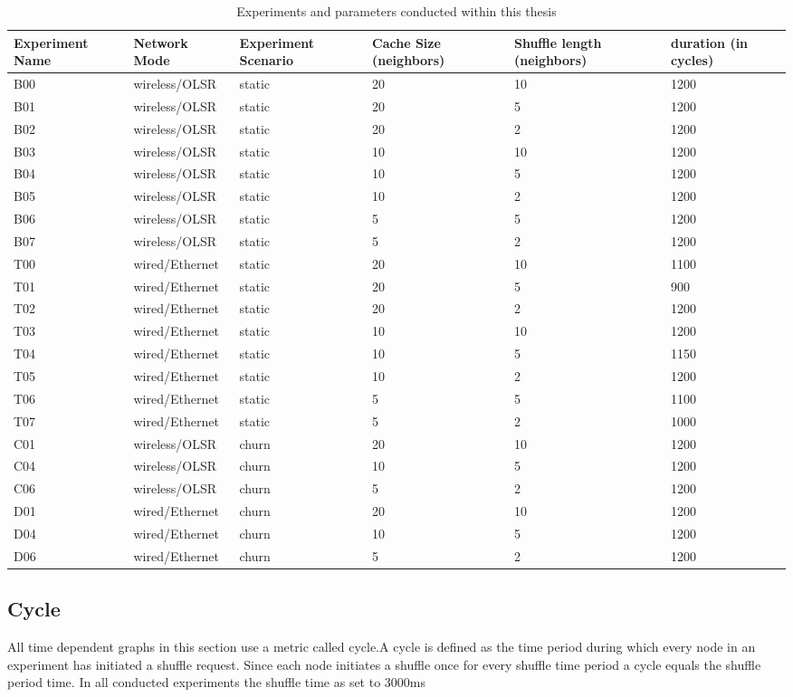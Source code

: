  \begin{table}
\begin{tabular} { |p{2cm}|l|p{1.9cm}|p{2cm}|p{2.5cm}|p{1.9cm}|}
\hline
Experiment Name & Network Mode & Experiment Scenario & Cache Size (neighbors) &
Shuffle length (neighbors) & duration (in cycles)\\
\hline
\hline
B00 & wireless/OLSR & static & 20 & 10 & 1200\\
B01 & wireless/OLSR & static & 20 & 5 & 1200\\
B02 & wireless/OLSR & static & 20 & 2 & 1200\\
B03 & wireless/OLSR & static & 10 & 10 & 1200\\
B04 & wireless/OLSR & static & 10 & 5 & 1200\\
B05 & wireless/OLSR & static & 10 & 2 & 1200\\
B06 & wireless/OLSR & static & 5 & 5 & 1200\\
B07 & wireless/OLSR & static & 5 & 2 & 1200\\
T00 & wired/Ethernet & static & 20 & 10 & 1100\\
T01 & wired/Ethernet & static & 20 & 5 & 900\\
T02 & wired/Ethernet & static & 20 & 2 & 1200\\
T03 & wired/Ethernet & static & 10 & 10 & 1200\\
T04 & wired/Ethernet & static & 10 & 5 & 1150\\
T05 & wired/Ethernet & static & 10 & 2 & 1200\\
T06 & wired/Ethernet & static & 5 & 5 & 1100\\
T07 & wired/Ethernet & static & 5 & 2 & 1000\\
C01 & wireless/OLSR & churn & 20 & 10 & 1200\\
C04 & wireless/OLSR & churn & 10 & 5 & 1200\\
C06 & wireless/OLSR & churn & 5 & 2 & 1200\\
D01 & wired/Ethernet & churn & 20 & 10 & 1200\\
D04 & wired/Ethernet & churn & 10 & 5 & 1200\\
D06 & wired/Ethernet & churn & 5 & 2 & 1200\\
\hline
\end{tabular}
\caption{Experiments and parameters conducted within this thesis}
\label{tab:experiments}
\end{table}
\subsection{Cycle}
All time dependent graphs in this section use a metric called cycle.A cycle
is defined as the time period during which every node in an experiment has initiated a shuffle request. Since each node initiates a shuffle once for
every shuffle time period a cycle equals the shuffle period time. In all
conducted experiments the shuffle time as set to 3000ms

